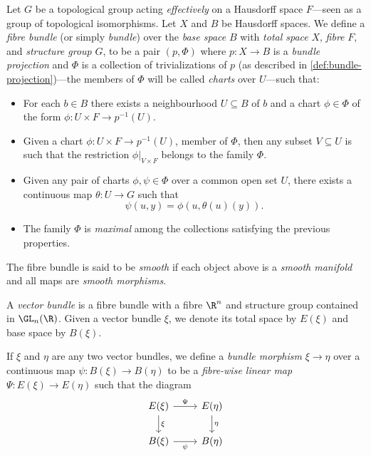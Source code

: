 \begin{definition}
\label{def:fibre-bundle}
Let \(G\) be a topological group acting \emph{effectively} on a Hausdorff space
\(F\)---seen as a group of topological isomorphisms. Let \(X\) and \(B\) be
Hausdorff spaces. We define a \emph{fibre bundle} (or simply \emph{bundle}) over
the \emph{base space} \(B\) with \emph{total space} \(X\), \emph{fibre} \(F\),
and \emph{structure group} \(G\), to be a pair \((p, \Phi)\) where
\(p: X \to B\) is a \emph{bundle projection} and \(\Phi\) is a collection of
trivializations of \(p\) (as described in \cref{def:bundle-projection})---the
members of \(\Phi\) will be called \emph{charts} over \(U\)---such that:
\begin{itemize}\setlength\itemsep{0em}
\item For each \(b \in B\) there exists a neighbourhood \(U \subseteq B\) of
  \(b\) and a chart \(\phi \in \Phi\) of the form
  \(\phi: U \times F \to p^{-1}(U)\).

\item Given a chart \(\phi: U \times F \to p^{-1}(U)\), member of \(\Phi\), then
  any subset \(V \subseteq U\) is such that the restriction
  \(\phi|_{V \times F}\) belongs to the family \(\Phi\).

\item Given any pair of charts \(\phi, \psi \in \Phi\) over a common open set
  \(U\), there exists a continuous map \(\theta: U \to G\) such that
  \[
  \psi(u, y) = \phi(u, \theta(u)(y)).
  \]

\item The family \(\Phi\) is \emph{maximal} among the collections satisfying the
  previous properties.
\end{itemize}
The fibre bundle is said to be \emph{smooth} if each object above is a
\emph{smooth manifold} and all maps are \emph{smooth morphisms}.
\end{definition}

\begin{definition}
\label{def:vector-bundle}
A \emph{vector bundle} is a fibre bundle with a fibre \(\R^n\) and structure
group contained in \(\GL_n(\R)\). Given a vector bundle \(\xi\), we denote its
total space by \(E(\xi)\) and base space by \(B(\xi)\).
\end{definition}

\begin{definition}
\label{def:morphism-vector-bundles}
If \(\xi\) and \(\eta\) are any two vector bundles, we define a \emph{bundle
  morphism} \(\xi \to \eta\) over a continuous map \(\psi: B(\xi) \to B(\eta)\)
to be a \emph{fibre-wise linear map} \(\Psi: E(\xi) \to E(\eta)\) such that the
diagram
\[
\begin{tikzcd}
E(\xi) \ar[d, "\xi"] \ar[r, "\Psi"] &E(\eta) \ar[d, "\eta"] \\
B(\xi) \ar[r, "\psi"'] &B(\eta)
\end{tikzcd}
\]
\end{definition}

